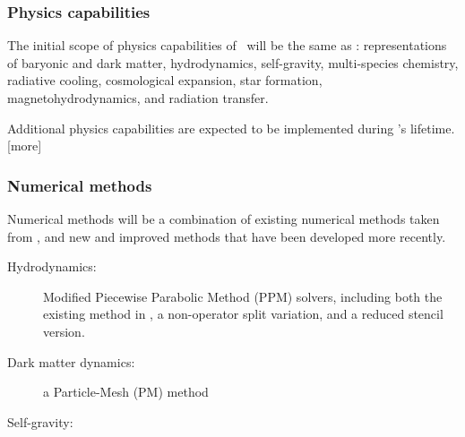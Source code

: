 \documentclass[11pt]{article}
\begin{document}

    \subsubsection{Physics capabilities}

    The initial scope of physics capabilities of \cello\ will be the
    same as \enzo: representations of baryonic and dark matter,
    hydrodynamics, self-gravity, multi-species chemistry, radiative
    cooling, cosmological expansion, star formation,
    magnetohydrodynamics, and radiation transfer.

    Additional physics capabilities are expected to be implemented
    during \cello's lifetime.  [more]

    \subsubsection{Numerical methods}

    Numerical methods will be a combination of existing numerical
    methods taken from \enzo, and new and improved methods that
    have been developed more recently.

    \begin{description}
% 
    \item[Hydrodynamics: ] Modified Piecewise Parabolic Method (PPM)
    solvers, including both the existing method in \enzo, a
    non-operator split variation, and a reduced stencil version.
%
    \item[Dark matter dynamics: ] a Particle-Mesh (PM) method
%
    \item[Self-gravity: ]  
    \end{description}
\end{document}

